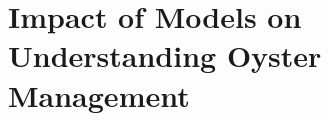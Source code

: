 \documentclass{article}
\begin{document}
\section{Impact of Models on Understanding Oyster Management}








\end{document}
